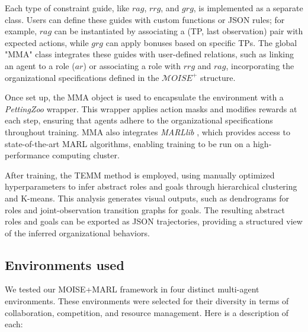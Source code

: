 \documentclass[sigconf,anonymous]{aamas}
\begin{document}
Each type of constraint guide, like $rag$, $rrg$, and $grg$, is implemented as a separate class. Users can define these guides with custom functions or JSON rules; for example, $rag$ can be instantiated by associating a (TP, last observation) pair with expected actions, while $grg$ can apply bonuses based on specific TPs. The global "MMA" class integrates these guides with user-defined relations, such as linking an agent to a role ($ar$) or associating a role with $rrg$ and $rag$, incorporating the organizational specifications defined in the $\mathcal{M}OISE^+$ structure.

Once set up, the MMA object is used to encapsulate the environment with a \textit{PettingZoo} wrapper. This wrapper applies action masks and modifies rewards at each step, ensuring that agents adhere to the organizational specifications throughout training. MMA also integrates \textit{MARLlib} \cite{hu2021marlib}, which provides access to state-of-the-art MARL algorithms, enabling training to be run on a high-performance computing cluster.

After training, the TEMM method is employed, using manually optimized hyperparameters to infer abstract roles and goals through hierarchical clustering and K-means. This analysis generates visual outputs, such as dendrograms for roles and joint-observation transition graphs for goals. The resulting abstract roles and goals can be exported as JSON trajectories, providing a structured view of the inferred organizational behaviors.


\subsection{Environments used}

We tested our MOISE+MARL framework in four distinct multi-agent environments. These environments were selected for their diversity in terms of collaboration, competition, and resource management. Here is a description of each:
\end{document}
